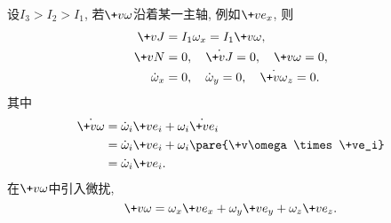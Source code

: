 \documentclass[../LectureNotes.tex]{subfiles}
\begin{document}
设$I_3 > I_2 > I_1$, 若$\+v\omega$沿着某一主轴, 例如$\+ve_x$, 则
\begin{align*}
    \+vJ &= I_1\omega_x = I_1\+v\omega, \\
    \+vN &= 0,\quad \dot{\+vJ} = 0,\quad \+v\omega = 0, \\
    \dot{\omega}_x &= 0,\quad \dot{\omega}_y = 0,\quad \dot{\+v\omega}_z = 0.
\end{align*}
其中
\begin{align*}
    \dot{\+v\omega} &= \dot{\omega}_i \+ve_i + \omega_i \dot{\+ve}_i \\
    &= \dot{\omega}_i \+ve_i + \omega_i\pare{\+v\omega\times\+ve_i} \\
    &= \dot{\omega}_i \+ve_i.
\end{align*}
在$\+v\omega$中引入微扰,
\[ \+v\omega = \omega_x\+ve_x + \omega_y\+ve_y + \omega_z\+ve_z. \]
\end{document}
